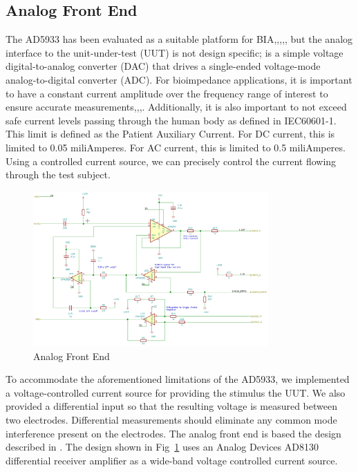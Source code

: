 \documentclass[]{IEEEtran}
\begin{document}
\subsection{Analog Front End}
The AD5933 has been evaluated as a suitable platform for
BIA\cite{breniuc_wearable_2014},\cite{ferreira_ad5933-based_2011},\cite{harder_smart_2016},\cite{bakr_aging_2016},\cite{pliquett_interfacing_2012}, but the analog interface to the unit-under-test (UUT) is not design specific; is a simple voltage digital-to-analog converter (DAC) that drives a single-ended voltage-mode analog-to-digital converter (ADC). For bioimpedance applications, it is important to have a constant current amplitude over the frequency range of interest to ensure accurate measurements\cite{bertemes-filho_mirrored_2012},\cite{seoane_analog_2008},\cite{pliquett_interfacing_2012},\cite{bera_battery-based_2013}. Additionally, it is also important to not exceed safe current levels passing through the human body as defined in IEC60601-1\cite{noauthor_iec_nodate}. This limit is defined as the Patient Auxiliary Current. For DC current, this is limited to 0.05 miliAmperes. For AC current, this is limited to 0.5 miliAmperes. Using a controlled current source, we can precisely control the current flowing through the test subject. 



\begin{figure} %
\centering
\includegraphics[width=9cm ]{./graphics/front_end.png}
\centering
\caption{Analog Front End}
\label{fig:front_end}
\end{figure}


To accommodate the aforementioned limitations of the AD5933, we implemented a voltage-controlled current source for providing the stimulus the UUT. We also provided a differential input so that the resulting voltage is measured between two electrodes. Differential measurements should eliminate any common mode interference present on the electrodes. The analog front end is based the design described in \cite{harder_smart_2016}. The design shown in Fig~\ref{fig:front_end} uses an Analog Devices AD8130 differential receiver amplifier\cite{noauthor_ad8130_nodate} as a wide-band voltage controlled current source.
\end{document}
